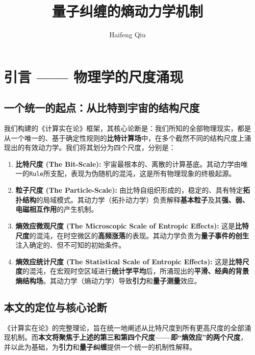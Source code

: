 \documentclass[12pt]{article}
\title{\textbf{量子纠缠的熵动力学机制}}
\author{Haifeng Qiu}
\begin{document}
\maketitle
\thispagestyle{empty} %
\newpage
\setcounter{page}{1}

\section{引言 —— 物理学的尺度涌现}

\subsection{一个统一的起点：从比特到宇宙的结构尺度}

我们构建的《计算实在论》框架，其核心论断是：我们所知的全部物理现实，都是从一个唯一的、基于确定性规则的\textbf{比特计算场}中，在多个截然不同的结构尺度上涌现出的有效动力学。我们将其划分为四个尺度，分别是：

\begin{enumerate}
    \item   \textbf{比特尺度 (The Bit-Scale):} 宇宙最根本的、离散的计算基底。其动力学由唯一的\texttt{Rule}所支配，表现为伪随机的混沌，这是所有物理现象的终极起源。
    
    \item   \textbf{粒子尺度 (The Particle-Scale):} 由比特自组织形成的，稳定的、具有特定\textbf{拓扑结构}的局域模式。其动力学（拓扑动力学）负责解释\textbf{基本粒子}及其\textbf{强、弱、电磁相互作用}的产生机制。
    
    \item   \textbf{熵效应微观尺度 (The Microscopic Scale of Entropic Effects):} 这是\textbf{比特尺度}的混沌，在时空微区的\textbf{高频涨落}的表现。其动力学负责为\textbf{量子事件的创生}注入确定的、但不可知的初始条件。
    
    \item   \textbf{熵效应统计尺度 (The Statistical Scale of Entropic Effects):} 这是\textbf{比特尺度}的混沌，在宏观时空区域进行\textbf{统计学平均}后，所涌现出的\textbf{平滑、经典的背景熵结构场}。其动力学（熵动力学）导致\textbf{引力}和\textbf{量子测量}效应。
\end{enumerate}

\subsection{本文的定位与核心论断}

《计算实在论》的完整理论，旨在统一地阐述从比特尺度到所有更高尺度的全部涌现机制。而\textbf{本文将聚焦于上述的第三和第四个尺度——即``熵效应''的两个尺度}，并以此为基础，为\textbf{引力}和\textbf{量子纠缠}提供一个统一的机制性解释。
\end{document}
